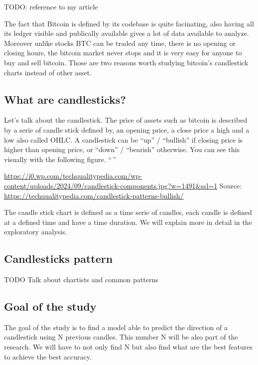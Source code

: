 \documentclass[
]{article}
\begin{document}
TODO: reference to my article

The fact that Bitcoin is defined by its codebase is quite facinating,
also having all its ledger visible and publically available gives a lot
of data available to analyze. Moreover unlike stocks BTC can be traded
any time, there is no opening or closing hours, the bitcoin market never
stops and it is very easy for anyone to buy and sell bitcoin. Those are
two reasons worth studying bitcoin's candlestick charts instead of other
asset.

\hypertarget{what-are-candlesticks}{%
\subsection{What are candlesticks?}\label{what-are-candlesticks}}

Let's talk about the candlestick. The price of assets such as bitcoin is
described by a serie of candle stick defined by, an opening price, a
close price a high and a low also called OHLC. A candlestick can be
``up'' / ``bullish'' if closing price is higher than opening price, or
``down'' / ``bearish'' otherwise. You can see this visually with the
following figure. ``\,''

\url{https://i0.wp.com/techqualitypedia.com/wp-content/uploads/2024/09/candlestick-components.jpg?w=1491\&ssl=1}
Source: \url{https://techqualitypedia.com/candlestick-patterns-bullish/}

The candle stick chart is defined as a time serie of candles, each
candle is defined at a defined time and have a time duration. We will
explain more in detail in the exploratory analysis.

\hypertarget{candlesticks-pattern}{%
\subsection{Candlesticks pattern}\label{candlesticks-pattern}}

TODO Talk about chartists and common patterns

\hypertarget{goal-of-the-study}{%
\subsection{Goal of the study}\label{goal-of-the-study}}

The goal of the study is to find a model able to predict the direction
of a candlestick using N previous candles. This number N will be also
part of the research. We will have to not only find N but also find what
are the best features to achieve the best accuracy.
\end{document}
